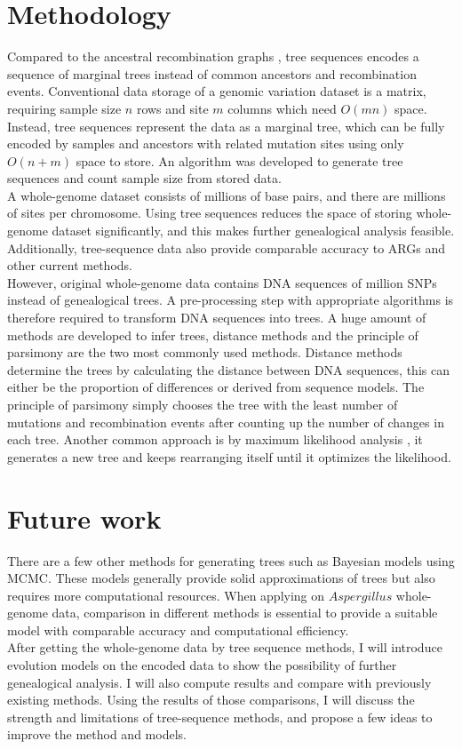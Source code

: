 \documentclass[11pt]{article}
\begin{document}
\section{Methodology}
Compared to the ancestral recombination graphs \citep{griffiths1996ancestral}, tree sequences \citep{kelleher2019inferring} encodes a sequence of marginal trees instead of common ancestors and recombination events. Conventional data storage of a genomic variation dataset is a matrix, requiring sample size $n$ rows and site $m$ columns which need $O(mn)$ space. Instead, tree sequences represent the data as a marginal tree, which can be fully encoded by samples and ancestors with related mutation sites using only $O(n+m)$ space to store. An algorithm was developed \citep{kelleher2016efficient} to generate tree sequences and count sample size from stored data. \\
A whole-genome dataset consists of millions of base pairs, and there are millions of sites per chromosome. Using tree sequences reduces the space of storing whole-genome dataset significantly, and this makes further genealogical analysis feasible. Additionally, tree-sequence data also provide comparable accuracy to ARGs and other current methods.\\
However, original whole-genome data contains DNA sequences of million SNPs instead of genealogical trees. A pre-processing step with appropriate algorithms is therefore required to transform DNA sequences into trees. A huge amount of methods are developed to infer trees, distance methods and the principle of parsimony are the two most commonly used methods. Distance methods determine the trees by calculating the distance between DNA sequences, this can either be the proportion of differences or derived from sequence models. The principle of parsimony simply chooses the tree with the least number of mutations and recombination events after counting up the number of changes in each tree. Another common approach is by maximum likelihood analysis \citep{yang2007paml}, it generates a new tree and keeps rearranging itself until it optimizes the likelihood. 

\section{Future work}
There are a few other methods for generating trees such as Bayesian models using MCMC. These models generally provide solid approximations of trees but also requires more computational resources. When applying on $Aspergillus$ whole-genome data, comparison in different methods is essential to provide a suitable model with comparable accuracy and computational efficiency. \\
After getting the whole-genome data by tree sequence methods, I will introduce evolution models on the encoded data to show the possibility of further genealogical analysis. I will also compute results and compare with previously existing methods. Using the results of those comparisons, I will discuss the strength and limitations of tree-sequence methods, and propose a few ideas to improve the method and models.  


\renewcommand\bibname{Reference}
\addcontentsline{toc}{chapter}{\bibname}


\end{document}

